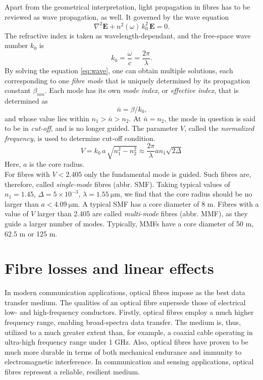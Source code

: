\documentclass{standalone}
\begin{document}
Apart from the geometrical interpretation, light propagation in fibres has to be reviewed as wave propagation, as well. It governed by the wave equation
\begin{equation} \label{eq:wave}
\nabla^2 \mathbf{E} + n^2(\omega) \, k_0^2 \, \mathbf{E} = 0 \textrm{.}
\end{equation}
The refractive index is taken as wavelength-dependant, and the free-space wave number $k_0$ is
\begin{equation}
k_0 = \frac{\omega}{c} = \frac{2 \pi}{\lambda} \textrm{.}
\end{equation}
By solving the equation \ref{eq:wave}, one can obtain multiple solutions, each corresponding to one \textit{fibre mode} that is uniquely determined by its propagation constant $\beta_{nm}$. Each mode has its own \textit{mode index}, or \textit{effective index}, that is determined as
\begin{equation}
\bar{n} = \beta/k_0 \textrm{,}
\end{equation}
and whose value lies within $n_1 > \bar{n} > n_2$. At $\bar{n} = n_2$, the mode in question is said to be in \textit{cut-off}, and is no longer guided. The parameter $V$, called the \textit{normalized frequency}, is used to determine cut-off condition.
\begin{equation}
V = k_0 \, a \, \sqrt{n_1^2 - n_2^2} \approx \frac{2 \pi}{\lambda} a n_1 \sqrt{2 \varDelta}
\end{equation}
Here, $a$ is the core radius. \\

For fibres with $V < 2.405$ only the fundamental mode is guided. Such fibres are, therefore, called \textit{single-mode} fibres (abbr. SMF). Taking typical values of $n_1 = 1.45$, $\varDelta = 5 \times 10^{-3}$, $\lambda = \SI{1.55}{\micro \meter}$, we find that the core radius should be no larger than $a < \SI{4.09}{\micro \meter}$. A typical SMF has a core diameter of 8 \textmu m. Fibres with a value of $V$ larger than 2.405 are called \textit{multi-mode} fibres (abbr. MMF), as they guide a larger number of modes. Typically, MMFs have a core diameter of 50 \textmu m, 62.5 \textmu m or 125 \textmu m.


\section{Fibre losses and linear effects}

In modern communication applications, optical fibres impose as the best data transfer medium. The qualities of an optical fibre supersede those of electrical low- and high-frequency conductors. Firstly, optical fibres employ a much higher frequency range, enabling broad-spectra data transfer. The medium is, thus, utilized to a much greater extent than, for example, a coaxial cable operating in ultra-high frequency range under 1 GHz. Also, optical fibres have proven to be much more durable in terms of both mechanical endurance and immunity to electromagnetic interference. In communication and sensing applications, optical fibres represent a reliable, resilient medium. \\
\end{document}
